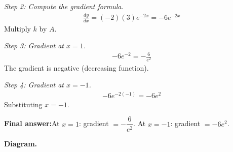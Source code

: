 \documentclass[11pt]{article}
\begin{document}
\textit{Step 2: Compute the gradient formula.}
\[\begin{gathered}
\frac{dy}{dx} = (-2)(3)e^{-2x} = -6e^{-2x}
\end{gathered}\]
Multiply \( k \) by \( A \).

\textit{Step 3: Gradient at \( x = 1 \).}
\[\begin{gathered}
-6e^{-2} = -\frac{6}{e^2}
\end{gathered}\]
The gradient is negative (decreasing function).

\textit{Step 4: Gradient at \( x = -1 \).}
\[\begin{gathered}
-6e^{-2(-1)} = -6e^{2}
\end{gathered}\]
Substituting \( x = -1 \).

\begin{answerbox}
\textbf{Final answer:}\quad At \(\displaystyle  x = 1 \): gradient \(\displaystyle  = -\dfrac{6}{e^2} \). At \(\displaystyle  x = -1 \): gradient \(\displaystyle  = -6e^2 \).
\end{answerbox}
\textbf{Diagram.}
\end{document}
